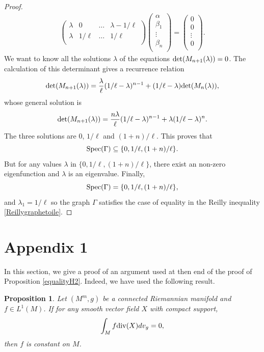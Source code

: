 \documentclass[12pt,english]{smfart} %
\newtheorem{proposition}[theorem]{Proposition}
\theoremstyle{remark}
\begin{document}
\begin{proof}
\begin{align*}
\begin{pmatrix}
			\lambda & 0 & \ldots   & \lambda-1/\ell \\
			\lambda & 1/\ell  &\ldots & 1/\ell \\
		\end{pmatrix}
		\begin{pmatrix}
			\alpha\\
			\beta_1\\
			\vdots \\
			\beta_n \\
		\end{pmatrix}
		=
		\begin{pmatrix}
			0 \\
			0\\
			\vdots\\
			0 \\
		\end{pmatrix}.
	\end{align*}
	We want to know all the solutions $\lambda$ of the equations $\textnormal{det}(M_{n+1}(\lambda))=0$. The calculation of this determinant gives a recurrence relation
	\begin{align*}
		\textnormal{det}(M_{n+1}(\lambda))=\frac{\lambda}{\ell}(1/\ell-\lambda)^{n-1}+(1/\ell-\lambda)\textnormal{det}(M_n(\lambda)),
	\end{align*}
	whose general solution is 
	\begin{align*}
		\textnormal{det} (M_{n+1}(\lambda)) = \frac{n\lambda}{\ell}(1/\ell-\lambda)^{n-1}+\lambda(1/\ell-\lambda)^n.
	\end{align*}
	The three solutions are $0$, $1/\ell$ and $(1+n)/\ell$. This proves that 
	$$\textnormal{Spec}(\Gamma) \subseteq \{0,1/\ell,(1+n)/\ell\}.$$ But for any values $\lambda$ in $\{0,1/\ell,(1+n)/\ell\}$, there exist an non-zero eigenfunction and $\lambda$ is an eigenvalue. Finally, 
	$$\textnormal{Spec}(\Gamma) =  \{0,1/\ell,(1+n)/\ell\},$$
	and $\lambda_1=1/\ell$ so the graph $\Gamma$ satisfies the case of equality in the Reilly inequality \ref{Reillygraphetoile}.
\end{proof}


\section{Appendix 1}

In this section, we give a proof of an argument used at then end of the proof of Proposition \ref{equalityH2}. Indeed, we have used the following result.

\medskip\begin{proposition}\label{f-constant} Let $(M^m,g)$ be a connected Riemannian manifold and $f\in L^1(M)$. If for any smooth vector field $X$ with compact support,
$$\int_M f{\rm div}(X)dv_g=0,$$
then $f$ is constant on $M$.
\end{proposition}
\end{document}
